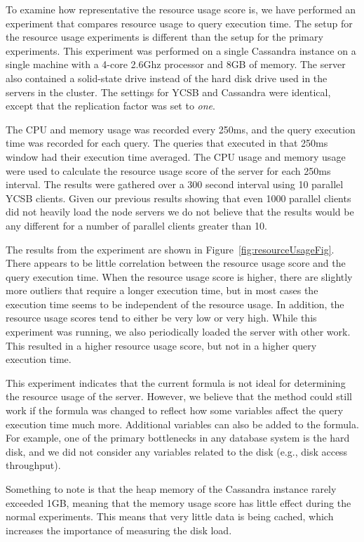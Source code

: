 To examine how representative the resource usage score is, we have performed an experiment that compares resource usage to query execution time. The setup for the resource usage experiments is different than the setup for the primary experiments. This experiment was performed on a single Cassandra instance on a single machine with a 4-core 2.6Ghz processor and 8GB of memory. The server also contained a solid-state drive instead of the hard disk drive used in the servers in the cluster. The settings for YCSB and Cassandra were identical, except that the replication factor was set to \textit{one}.

The CPU and memory usage was recorded every 250ms, and the query execution time was recorded for each query. The queries that executed in that 250ms window had their execution time averaged. The CPU usage and memory usage were used to calculate the resource usage score of the server for each 250ms interval. The results were gathered over a 300 second interval using 10 parallel YCSB clients. Given our previous results showing that even 1000 parallel clients did not heavily load the node servers we do not believe that the results would be any different for a number of parallel clients greater than 10.

The results from the experiment are shown in Figure~\ref{fig:resourceUsageFig}. There appears to be little correlation between the resource usage score and the query execution time. When the resource usage score is higher, there are slightly more outliers that require a longer execution time, but in most cases the execution time seems to be independent of the resource usage. In addition, the resource usage scores tend to either be very low or very high. While this experiment was running, we also periodically loaded the server with other work. This resulted in a higher resource usage score, but not in a higher query execution time.

This experiment indicates that the current formula is not ideal for determining the resource usage of the server. However, we believe that the method could still work if the formula was changed to reflect how some variables affect the query execution time much more.  Additional variables can also be added to the formula. For example, one of the primary bottlenecks in any database system is the hard disk, and we did not consider any variables related to the disk (e.g., disk access throughput).

Something to note is that the heap memory of the Cassandra instance rarely exceeded 1GB, meaning that the memory usage score has little effect during the normal experiments. This means that very little data is being cached, which increases the importance of measuring the disk load.

